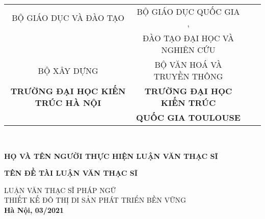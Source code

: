 \documentclass[../thesis.tex]{subfiles}
\begin{document}
\begin{titlepage}

\begin{center}
\begin{table}
\small
\centering
\begin{tabular}{c c r l}
BỘ GIÁO DỤC VÀ ĐÀO TẠO  &  BỘ GIÁO DỤC QUỐC GIA ,\\
 & ĐÀO TẠO ĐẠI HỌC VÀ NGHIÊN CỨU\\ 
BỘ XÂY DỰNG & BỘ VĂN HOÁ VÀ TRUYỀN THÔNG\\
\textbf{TRƯỜNG ĐẠI HỌC KIẾN TRÚC HÀ NỘI} & \textbf{TRƯỜNG ĐẠI HỌC KIẾN TRÚC}\\
& \textbf{QUỐC GIA TOULOUSE}
\end{tabular}
\\[2cm]
\end{table}

\textbf{HỌ VÀ TÊN NGƯỜI THỰC HIỆN LUẬN VĂN THẠC SĨ\\[2cm]}


\textbf{\large TÊN ĐỀ TÀI LUẬN VĂN THẠC SĨ \\[2cm]}

LUẬN VĂN THẠC SĨ PHÁP NGỮ\\
THIẾT KẾ ĐÔ THỊ DI SẢN PHÁT TRIỂN BỀN VỮNG\\[8cm]


\textbf{Hà Nội, 03/2021}

\end{center}

\end{titlepage}
\end{document}
